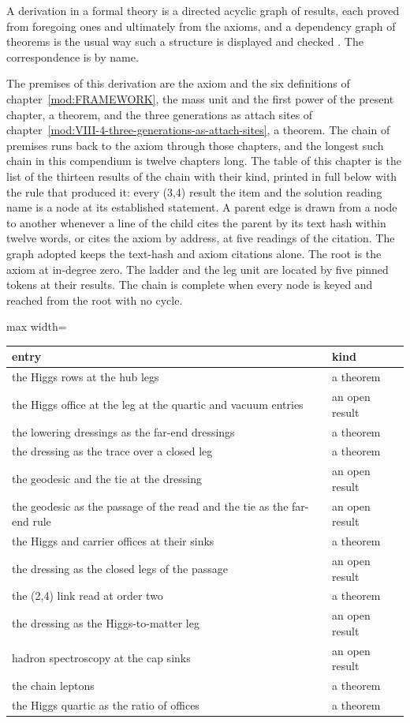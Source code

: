 \begin{chbridge}
A derivation in a formal theory is a directed acyclic graph of results, each proved from foregoing ones and ultimately from the axioms, and a dependency graph of theorems is the usual way such a structure is displayed and checked \cite{Avigad2021,Weinberg1995}. The correspondence is by name.
\end{chbridge}
\begin{chproof}[instrument]
The premises of this derivation are the axiom and the six definitions of chapter~\ref{mod:FRAMEWORK}, the mass unit and the first power of the present chapter, a theorem, and the three generations as attach sites of chapter~\ref{mod:VIII-4-three-generations-as-attach-sites}, a theorem. The chain of premises runs back to the axiom through those chapters, and the longest such chain in this compendium is twelve chapters long.
The table of this chapter is the list of the thirteen results of the chain with their kind, printed in full below with the rule that produced it: every (3,4) result the item and the solution reading name is a node at its established statement. A parent edge is drawn from a node to another whenever a line of the child cites the parent by its text hash within twelve words, or cites the axiom by address, at five readings of the citation. The graph adopted keeps the text-hash and axiom citations alone. The root is the axiom at in-degree zero. The ladder and the leg unit are located by five pinned tokens at their results. The chain is complete when every node is keyed and reached from the root with no cycle.
\begin{center}\begin{adjustbox}{max width=\linewidth}\begin{tabular}{ll}\hline entry & kind \\ \hline the Higgs rows at the hub legs & a theorem \\ the Higgs office at the leg at the quartic and vacuum entries & an open result \\ the lowering dressings as the far-end dressings & a theorem \\ the dressing as the trace over a closed leg & a theorem \\ the geodesic and the tie at the dressing & an open result \\ the geodesic as the passage of the read and the tie as the far-end rule & an open result \\ the Higgs and carrier offices at their sinks & a theorem \\ the dressing as the closed legs of the passage & an open result \\ the (2,4) link read at order two & a theorem \\ the dressing as the Higgs-to-matter leg & an open result \\ hadron spectroscopy at the cap sinks & an open result \\ the chain leptons & a theorem \\ the Higgs quartic as the ratio of offices & a theorem \\ \hline \end{tabular}\end{adjustbox}\end{center}

\end{chproof}
